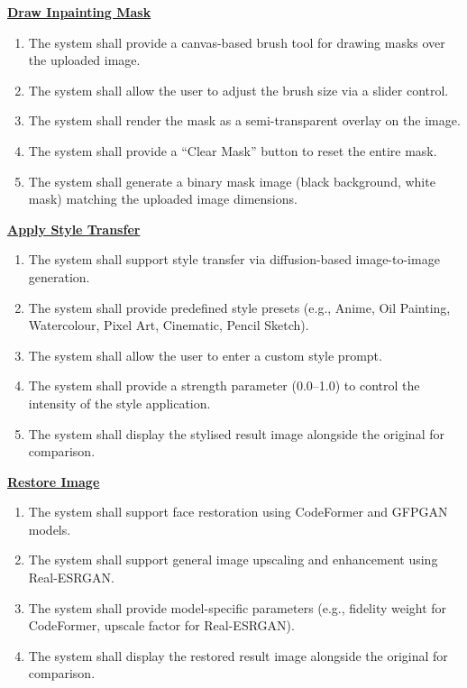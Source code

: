 \documentclass[12pt,a4paper]{report}
\begin{document}
\vspace{0.5em}
\noindent\underline{\textbf{Draw Inpainting Mask}}

\begin{enumerate}[label=\textbf{FR-\arabic*}.,start=11]
    \item The system shall provide a canvas-based brush tool for drawing masks over the uploaded image.
    \item The system shall allow the user to adjust the brush size via a slider control.
    \item The system shall render the mask as a semi-transparent overlay on the image.
    \item The system shall provide a ``Clear Mask'' button to reset the entire mask.
    \item The system shall generate a binary mask image (black background, white mask) matching the uploaded image dimensions.
\end{enumerate}

\vspace{0.5em}
\noindent\underline{\textbf{Apply Style Transfer}}

\begin{enumerate}[label=\textbf{FR-\arabic*}.,start=16]
    \item The system shall support style transfer via diffusion-based image-to-image generation.
    \item The system shall provide predefined style presets (e.g., Anime, Oil Painting, Watercolour, Pixel Art, Cinematic, Pencil Sketch).
    \item The system shall allow the user to enter a custom style prompt.
    \item The system shall provide a strength parameter (0.0--1.0) to control the intensity of the style application.
    \item The system shall display the stylised result image alongside the original for comparison.
\end{enumerate}

\vspace{0.5em}
\noindent\underline{\textbf{Restore Image}}

\begin{enumerate}[label=\textbf{FR-\arabic*}.,start=21]
    \item The system shall support face restoration using CodeFormer and GFPGAN models.
    \item The system shall support general image upscaling and enhancement using Real-ESRGAN.
    \item The system shall provide model-specific parameters (e.g., fidelity weight for CodeFormer, upscale factor for Real-ESRGAN).
    \item The system shall display the restored result image alongside the original for comparison.
\end{enumerate}
\end{document}
